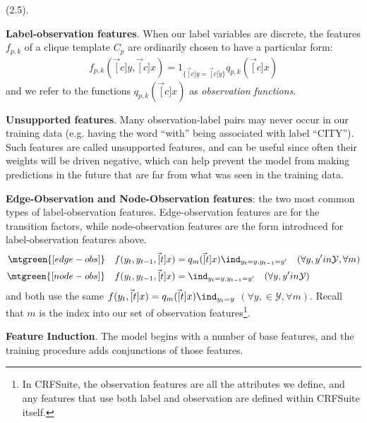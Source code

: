 \documentclass[11pt]{article}
\begin{document}
\myspace
\p {} (2.5). 
\begin{compactitem}
	\item \textbf{Label-observation features}. When our label variables are discrete, the features $f_{p,k}$ of a clique template $C_p$ are ordinarily chosen to have a particular form:
	\begin{align}
	f_{p,k}(\vec[c]{y}, \vec[c]{x}) = 1_{\{ \vec[c]{y} = \vec[c]{\widetilde y} \}} q_{p,k}(\vec[c]{x})
	\end{align}
	and we refer to the functions $q_{p,k}(\vec[c]{x})$ as \textit{observation functions}.
	
	\item \textbf{Unsupported features}. Many observation-label pairs may never occur in our training data (e.g. having the word ``with'' being associated with label ``CITY''). Such features are called unsupported features, and can be useful since often their weights will be driven negative, which can help prevent the model from making predictions in the future that are far from what was seen in the training data.
	
	\item \textbf{Edge-Observation and Node-Observation features}: the two most common types of label-observation features. Edge-observation features are for the transition factors, while node-observation features are the form introduced for label-observation features above.
	\begin{align}
	\mtgreen{[edge-obs]} \quad f(y_t, y_{t - 1}, \vec[t]{x}) &= q_m(\vec[t]{x})\ind_{y_t=y,y_{t-1}=y'} \quad (\forall y, y' in \mathcal{Y}, \forall m) \\
	\mtgreen{[node-obs]} \quad f(y_t, y_{t - 1}, \vec[t]{x}) &= \ind_{y_t=y,y_{t-1}=y'} \quad (\forall y, y' in \mathcal{Y})
	\end{align}
	and both use the same $f(y_t, \vec[t]{x}) = q_m(\vec[t]{x}) \ind_{y_t = y}$ $(\forall y, \in \mathcal{Y}, \forall m)$. Recall that $m$ is the index into our set of observation features\footnote{In CRFSuite, the observation features are all the attributes we define, and any features that use both label and observation are defined within CRFSuite itself.}.
	
	\item \textbf{Feature Induction}. The model begins with a number of base features, and the training procedure adds conjunctions of those features.
\end{compactitem}


\myspace{}
\myspace
\end{document}
